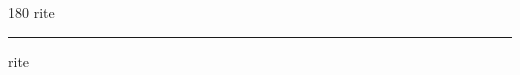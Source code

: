 
\begin{frame}
\begin{center}
\begin{turn}{180}
{\fontsize{2.5cm}{1em}\selectfont rite}
\end{turn}
\vspace{1em}\par  
\hrule
\vspace{1em}\par  
{\fontsize{2.5cm}{1em}\selectfont rite}
\end{center}
\end{frame}
